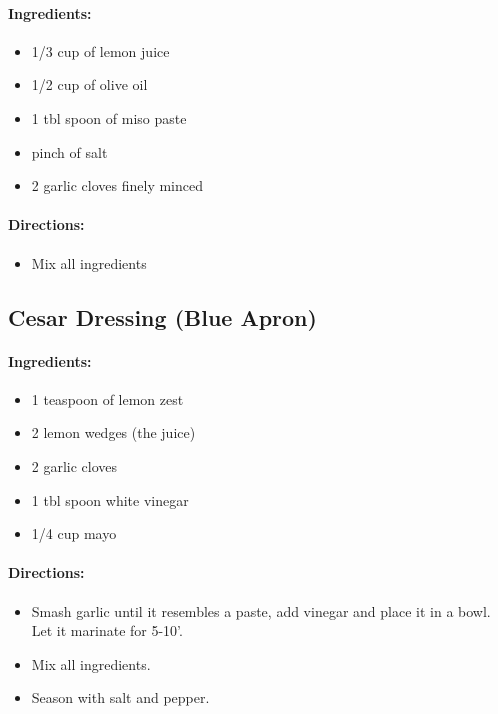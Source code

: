 \documentclass{article}
\begin{document}
\paragraph{Ingredients:}
\begin{itemize}
    \item 1/3 cup of lemon juice
    \item 1/2 cup of olive oil
    \item 1 tbl spoon of miso paste
    \item pinch of salt
    \item 2 garlic cloves finely minced
\end{itemize}

\paragraph{Directions:}
\begin{itemize}
    \item Mix all ingredients
\end{itemize}

\subsection{Cesar Dressing (Blue Apron)}

\paragraph{Ingredients:}
\begin{itemize}
    \item 1 teaspoon of lemon zest
    \item 2 lemon wedges (the juice)
    \item 2 garlic cloves
    \item 1 tbl spoon white vinegar
    \item 1/4 cup mayo
\end{itemize}

\paragraph{Directions:}
\begin{itemize}
    \item Smash garlic until it resembles a paste, add vinegar and place it in a bowl. Let it marinate for 5-10'.
    \item Mix all ingredients.
    \item Season with salt and pepper.
\end{itemize}
\end{document}

